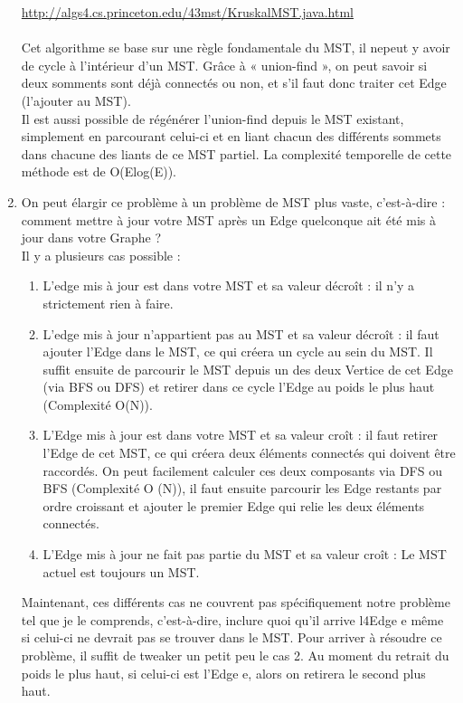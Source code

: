 \documentclass[11pt]{article}
\begin{document}
\begin{enumerate}
\url{http://algs4.cs.princeton.edu/43mst/KruskalMST.java.html}
\\
\\
Cet algorithme se base sur une règle fondamentale du MST, il nepeut y avoir de cycle à l’intérieur d’un MST. Grâce à « union-find », on peut savoir si deux somments sont déjà connectés ou non, et s’il faut donc traiter cet Edge (l’ajouter au MST).
\\
Il est aussi possible de régénérer l’union-find depuis le MST existant, simplement en parcourant celui-ci et en liant chacun des différents sommets dans chacune des liants de ce MST partiel.
La complexité temporelle de cette méthode est de O(Elog(E)).

\item On peut élargir ce problème à un problème de MST plus vaste, c’est-à-dire : comment mettre à jour votre MST après un Edge quelconque  ait été mis à jour dans votre Graphe ? \\
Il y a plusieurs cas possible :
\begin{enumerate}
	
	\item L’edge mis à jour est dans votre MST et sa valeur décroît : il n’y a strictement rien à faire.
	\item L’edge mis à jour n’appartient pas au MST et sa valeur décroît : il faut ajouter l’Edge dans le MST, ce qui créera un 		cycle au sein du MST. Il suffit ensuite de parcourir le MST depuis un des deux Vertice de cet Edge (via BFS ou DFS) et 			retirer dans ce cycle l’Edge au poids le plus haut (Complexité O(N)).
	\item L’Edge mis à jour est dans votre MST et sa valeur croît : il faut retirer  l’Edge de cet MST, ce qui créera deux éléments connectés qui doivent être raccordés. On peut facilement calculer ces deux composants via DFS ou BFS (Complexité O	(N)), il faut ensuite parcourir les Edge restants par ordre croissant et ajouter le premier Edge qui relie les deux éléments connectés.
	\item L’Edge mis à jour ne fait pas partie du MST et sa valeur croît : Le MST actuel est toujours un MST.
	
	\end{enumerate}
Maintenant, ces différents cas ne couvrent pas spécifiquement notre problème tel que je le comprends, c’est-à-dire, inclure quoi qu’il arrive l4Edge e même si celui-ci ne devrait pas se trouver dans le MST. Pour arriver à résoudre ce problème, il suffit de tweaker un petit peu le cas 2. Au moment du retrait du poids le plus haut, si celui-ci est l’Edge e, alors on retirera le second plus haut.



\end{enumerate}
\end{document}
